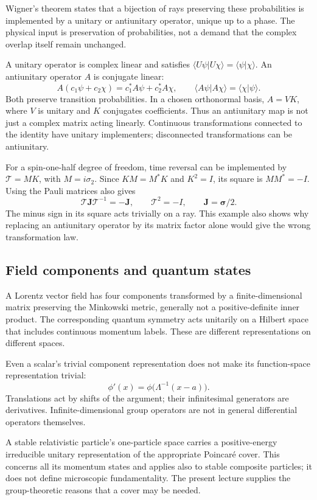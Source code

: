 \documentclass[11pt]{article}
\begin{document}
Wigner's theorem states that a bijection of rays preserving these
probabilities is implemented by a unitary or antiunitary operator,
unique up to a phase. The physical input is preservation of probabilities,
not a demand that the complex overlap itself remain unchanged.

A unitary operator is complex linear and satisfies
\(\langle U\psi|U\chi\rangle=\langle\psi|\chi\rangle\).
An antiunitary operator \(A\) is conjugate linear:
\begin{equation}
 A(c_1\psi+c_2\chi)=c_1^*A\psi+c_2^*A\chi,
 \qquad \langle A\psi|A\chi\rangle=\langle\chi|\psi\rangle.
 \label{eq:antiunitary}
\end{equation}
Both preserve transition probabilities. In a chosen orthonormal basis,
\(A=VK\), where \(V\) is unitary and \(K\) conjugates coefficients.
Thus an antiunitary map is not just a complex matrix acting linearly.
Continuous transformations connected to the identity have unitary
implementers; disconnected transformations can be antiunitary.

For a spin-one-half degree of freedom, time reversal can be implemented
by \(\mathcal T=MK\), with \(M=i\sigma_2\). Since
\(KM=M^*K\) and \(K^2=I\), its square is \(MM^*=-I\).
Using the Pauli matrices also gives
\[
 \mathcal T\bm J\mathcal T^{-1}=-\bm J,\qquad
 \mathcal T^2=-I,\qquad \bm J=\bm\sigma/2.
\]
The minus sign in its square acts trivially on a ray. This example also
shows why replacing an antiunitary operator by its matrix factor alone
would give the wrong transformation law.

\subsection{Field components and quantum states}
A Lorentz vector field has four components transformed by a
finite-dimensional matrix preserving the Minkowski metric, generally not
a positive-definite inner product. The corresponding quantum symmetry
acts unitarily on a Hilbert space that includes continuous momentum
labels. These are different representations on different spaces.

Even a scalar's trivial component representation does not make its
function-space representation trivial:
\[
 \phi'(x)=\phi\bigl(\Lambda^{-1}(x-a)\bigr).
\]
Translations act by shifts of the argument; their infinitesimal generators
are derivatives. Infinite-dimensional group operators are not in general
differential operators themselves.

A stable relativistic particle's one-particle space carries a
positive-energy irreducible unitary representation of the appropriate
Poincar\'e cover. This concerns all its momentum states and applies also
to stable composite particles; it does not define microscopic
fundamentality. The present lecture supplies the group-theoretic reasons
that a cover may be needed.
\end{document}
